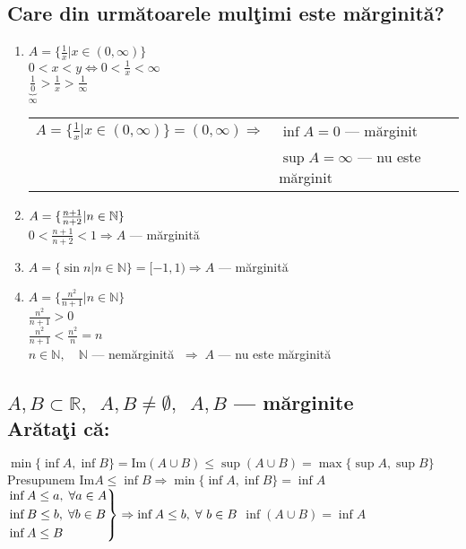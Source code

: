 \documentclass[a4paper, 12pt, notitlepage]{book}
\begin{document}
    \subsection{Care din urm\u{a}toarele mul\c{t}imi este m\u{a}rginit\u{a}?}
    \begin{enumerate}[\quad a.]
      \item $A = \{ \frac{1}{x} \vert x \in (0,\infty) \}$\\[5pt]
            $0 < x < y \Leftrightarrow 0 < \frac{1}{x} < \infty$\\[5pt]
            $\underbrace{\frac{1}{0}}_{\infty} > \frac{1}{x} > \frac{1}{\infty} $\\[5pt]
            \begin{tabular}{ll}
              $A = \{ \frac{1}{x} \vert x \in (0,\infty) \} = (0, \infty) \Rightarrow$ & $\inf A = 0$ --- m\u{a}rginit\\
                                                                                       & $\sup A = \infty$ --- nu este m\u{a}rginit
            \end{tabular}
      \item $A = \{ \frac{n+1}{n+2} \arrowvert n \in \mathbb{N} \}$\\[5pt]
            $0 < \frac{n+1}{n+2} < 1 \Rightarrow A$ --- m\u{a}rginit\u{a}
      \item $A = \{ \sin n | n \in \mathbb{N} \} = [-1, 1) \Rightarrow A$ --- m\u{a}rginit\u{a}
      \item $A = \{ \frac{n^{2}}{n+1} | n \in \mathbb{N} \}$\\[5pt]
            $\frac{n^{2}}{n+1} > 0$\\[5pt]
            $\frac{n^{2}}{n+1} < \frac{n^{2}}{n} = n$\\[5pt]
            $n \in \mathbb{N},\quad \mathbb{N}$ --- nem\u{a}rginit\u{a} $\; \Rightarrow \; A$ --- nu este m\u{a}rginit\u{a}
    \end{enumerate}

    \subsection{$A, B \subset \mathbb{R},\;\; A, B \ne \emptyset,\;\; A, B$ --- m\u{a}rginite\\
      Ar\u{a}ta\c{t}i c\u{a}:}
    $\min \{ \inf A, \inf B \} = \text{Im}(A \cup B) \le \sup (A \cup B) = \max \{ \sup A, \sup B \}$\\[5pt]
    Presupunem \;\; $\text{Im} A \le \inf B \Rightarrow \min \{ \inf A, \inf B \} = \inf A$\\[5pt]
    \begin{math}
      \begin{rcases}
        \inf A \le a,\; \forall a \in A\\
        \inf B \le b,\; \forall b \in B\\
        \inf A \le B
      \end{rcases}
      \Rightarrow \inf A \le b,\; \forall\ b \in B\\[5pt]
    \end{math}
    $\inf (A \cup B) = \inf A$\\[5pt]
\end{document}
